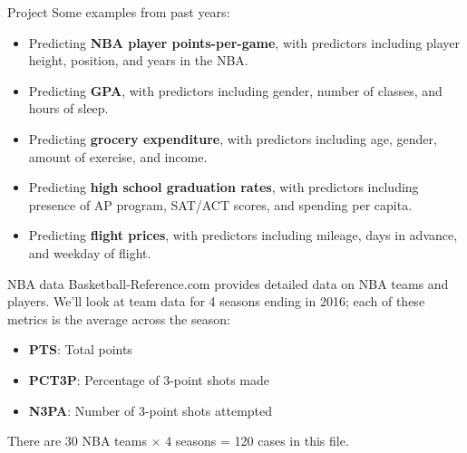 \documentclass{beamer}\usepackage[]{graphicx}\usepackage[]{color}
\begin{document}
\begin{darkframes}
    \begin{frame}{Project}
      Some examples from past years:
      \begin{itemize}
      \item Predicting \textbf{NBA player points-per-game}, with predictors including
        player height, position, and years in the NBA.
      \item  Predicting \textbf{GPA}, with predictors including gender, number of classes, and hours of sleep.
      \item Predicting \textbf{grocery expenditure}, with predictors including  age, gender, amount of exercise, and income.
      \item  Predicting \textbf{high school graduation rates}, with predictors including presence of AP program, SAT/ACT scores, and
        spending per capita.
      \item Predicting \textbf{flight prices}, with predictors including mileage, days in advance, and
        weekday of flight.
      \end{itemize}
    \end{frame}

    \begin{frame}{NBA data}
      Basketball-Reference.com provides detailed data on NBA teams and players. We'll look at team data for 4 seasons ending in 2016; each of these metrics is the average across the season:
      \begin{itemize}
        \item \textbf{PTS}: Total points
        \item \textbf{PCT3P}: Percentage of 3-point shots made
        \item \textbf{N3PA}: Number of 3-point shots attempted
      \end{itemize}
      There are 30 NBA teams $\times$ 4 seasons = 120 cases in this file.
    \end{frame}


\end{darkframes}
\end{document}
